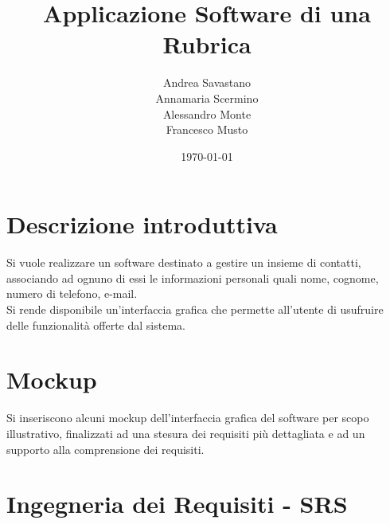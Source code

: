 \documentclass[12pt, a4paper]{article}
\title{\Huge Applicazione Software di una Rubrica}
\author{Andrea Savastano 
	\\ Annamaria Scermino
	\\ Alessandro Monte 
	\\ Francesco Musto}
\date{\today}
\begin{document}
	\fancyhf{}
	\thispagestyle{fancy}
	
	\maketitle
	\newpage
	\tableofcontents 
	\listoffigures
	
	\newpage
	\section*{Descrizione introduttiva}
	Si vuole realizzare un software destinato a gestire un insieme di contatti, associando ad ognuno di essi le informazioni personali quali nome, cognome, numero di telefono, e-mail.
	\vspace{.2cm}\\Si rende disponibile un'interfaccia grafica che permette all'utente di usufruire delle funzionalità offerte dal sistema.
	
	\section*{Mockup}
	Si inseriscono alcuni mockup dell'interfaccia grafica del software per scopo illustrativo, finalizzati ad una stesura dei requisiti più dettagliata e ad un supporto alla comprensione dei requisiti.
	
	\newpage
	\fancyhf{} %
	\fancyhead[L]{\nouppercase{\leftmark}} %
	\section{Ingegneria dei Requisiti - SRS}
	
	
\end{document}
